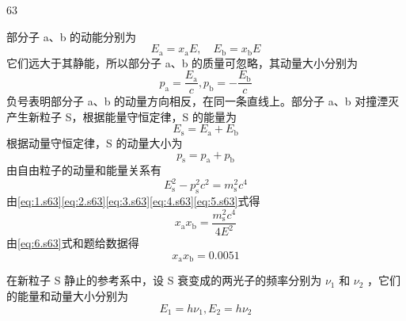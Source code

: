 \begin{solution}{63}
    \begin{subsolution}
        部分子 a、b 的动能分别为
        \begin{equation}
            E _ {\mathrm{a}} = x _ {\mathrm{a}} E, \quad E _ {\mathrm{b}} = x _ {\mathrm{b}} E
            \label{eq:1.s63}
        \end{equation}
        它们远大于其静能，所以部分子 a、b 的质量可忽略，其动量大小分别为
        \begin{equation}
            p _ {\mathrm{a}} = \frac {E _ {\mathrm{a}}}{c}, p _ {\mathrm{b}} = - \frac {E _ {\mathrm{b}}}{c}
            \label{eq:2.s63}
        \end{equation}
        负号表明部分子 a、b 的动量方向相反，在同一条直线上。部分子 a、b 对撞湮灭产生新粒子 S，根据能量守恒定律，S 的能量为
        \begin{equation}
            E _ {\mathrm{s}} = E _ {\mathrm{a}} + E _ {\mathrm{b}}
            \label{eq:3.s63}
        \end{equation}
        根据动量守恒定律，S 的动量大小为
        \begin{equation}
            p _ {\mathrm{s}} = p _ {\mathrm{a}} + p _ {\mathrm{b}}
            \label{eq:4.s63}
        \end{equation}
        由自由粒子的动量和能量关系有
        \begin{equation}
            E _ {\mathrm{s}}^{2} - p _ {\mathrm{s}}^{2} c^{2} = m _ {\mathrm{s}}^{2} c^{4}
            \label{eq:5.s63}
        \end{equation}
        由\eqref{eq:1.s63}\eqref{eq:2.s63}\eqref{eq:3.s63}\eqref{eq:4.s63}\eqref{eq:5.s63}式得
        \begin{equation}
            x _ {\mathrm{a}} x _ {\mathrm{b}} = \frac {m _ {\mathrm{s}}^{2} c^{4}}{4 E^{2}}
            \label{eq:6.s63}
        \end{equation}
        由\eqref{eq:6.s63}式和题给数据得
        \begin{equation}
            x _ {\mathrm{a}} x _ {\mathrm{b}} = 0.0051
            \label{eq:7.s63}
        \end{equation}
    \end{subsolution}
    \begin{subsolution}
        在新粒子 S 静止的参考系中，设 S 衰变成的两光子的频率分别为 $\nu_{1}$ 和 $\nu_{2}$ ，它们的能量和动量大小分别为
        \begin{equation}
            E _ {1} = h \nu_{1}, E _ {2} = h \nu_{2}

\end{equation}
\end{subsolution}
\end{solution}
